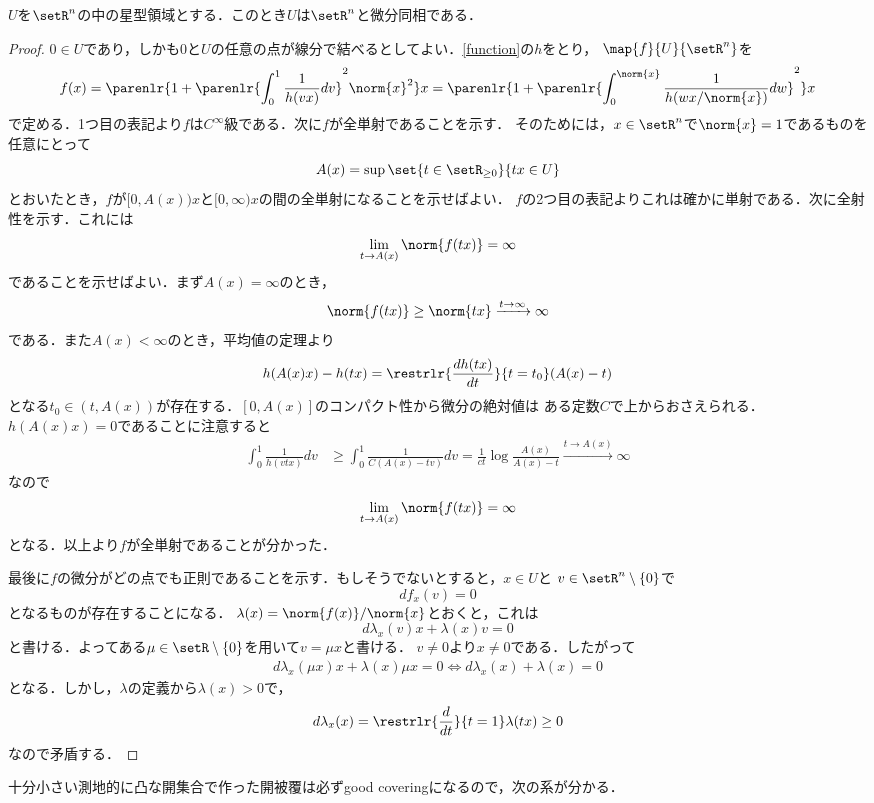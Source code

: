 \documentclass[uplatex]{jsarticle}
\begin{document}
\begin{proposition}
  $U$を$\setR^n$の中の星型領域とする．このとき$U$は$\setR^n$と微分同相である．
\end{proposition}

\begin{proof}
  $0\in U$であり，しかも0と$U$の任意の点が線分で結べるとしてよい．\cref{function}の$h$をとり，
  $\map{f}{U}{\setR^n}$を
    \[f(x)=\parenlr{1+\parenlr{\int_0^1 \frac{1}{h(vx)}dv}^2\norm{x}^2}x
    =\parenlr{1+\parenlr{\int_0^{\norm{x}}\frac{1}{h(wx/\norm{x})}dw }^2 }x \]
  で定める．1つ目の表記より$f$は$C^\infty$級である．次に$f$が全単射であることを示す．
  そのためには，$x\in \setR^n$で$\norm{x}=1$であるものを任意にとって
    \[A(x)=\sup\set{t\in \setR_{\geq0}}{tx\in U}\]
  とおいたとき，$f$が$[0, A(x))x$と$[0,\infty)x$の間の全単射になることを示せばよい．
  $f$の2つ目の表記よりこれは確かに単射である．次に全射性を示す．これには
    \[\lim_{t\to A(x)} \norm{f(tx)} = \infty \]
  であることを示せばよい．まず$A(x)=\infty$のとき，
    \[\norm{f(tx)} \geq \norm{tx} \xrightarrow{t\to \infty} \infty \]
  である．また$A(x)< \infty$のとき，平均値の定理より
    \[h(A(x)x)-h(tx)=\restrlr{\frac{dh(tx)}{dt}}{t=t_0} (A(x)-t) \]
  となる$t_0\in (t, A(x))$が存在する．$[0,A(x)]$のコンパクト性から微分の絶対値は
  ある定数$C$で上からおさえられる．$h(A(x)x)=0$であることに注意すると
  \begin{align*}
    \int_0^1 \frac{1}{h(vtx)}dv&\geq \int_0^1 \frac{1}{C(A(x)-tv)}dv
    =\frac{1}{ct}\log\frac{A(x)}{A(x)-t}\xrightarrow{t\to A(x)} \infty
  \end{align*}
  なので
    \[\lim_{t\to A(x)} \norm{f(tx)}=\infty \]
  となる．以上より$f$が全単射であることが分かった．

  最後に$f$の微分がどの点でも正則であることを示す．もしそうでないとすると，$x\in U$と
  $v\in \setR^n\setminus\{0\}$で
    \[df_x(v) = 0\]
  となるものが存在することになる．
  $\lambda(x) = \norm{f(x)}/\norm{x}$とおくと，これは
    \[d\lambda_x(v)x+\lambda(x)v = 0 \]
  と書ける．よってある$\mu \in \setR\setminus\{0\}$を用いて$v = \mu x$と書ける．
  $v\neq 0$より$x\neq 0$である．したがって
  \begin{align*}
    d\lambda_x(\mu x)x+\lambda(x)\mu x=0 \iff d\lambda_x(x)+\lambda(x)=0
  \end{align*}
  となる．しかし，$\lambda$の定義から$\lambda(x)>0$で，
    \[d\lambda_x(x)=\restrlr{\frac{d}{dt}}{t=1}\lambda(tx)\geq 0\]
  なので矛盾する．
\end{proof}

十分小さい測地的に凸な開集合で作った開被覆は必ずgood coveringになるので，次の系が分かる．
\end{document}
